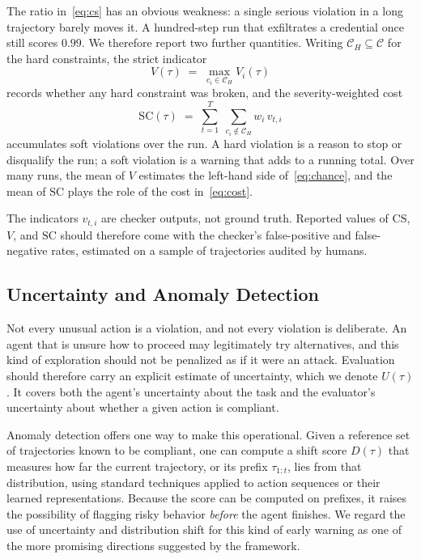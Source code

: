 \documentclass{article}
\begin{document}
The ratio in~\eqref{eq:cs} has an obvious weakness: a single serious violation in a long trajectory barely moves it. A hundred-step run that exfiltrates a credential once still scores $0.99$. We therefore report two further quantities. Writing $\mathcal{C}_H\subseteq\mathcal{C}$ for the hard constraints, the strict indicator
\begin{equation}
    V(\tau) \;=\; \max_{c_i\in\mathcal{C}_H} V_i(\tau)
    \label{eq:strict}
\end{equation}
records whether any hard constraint was broken, and the severity-weighted cost
\begin{equation}
    \mathrm{SC}(\tau) \;=\; \sum_{t=1}^{T}\;\sum_{c_i\notin\mathcal{C}_H} w_i\, v_{t,i}
    \label{eq:sc}
\end{equation}
accumulates soft violations over the run. A hard violation is a reason to stop or disqualify the run; a soft violation is a warning that adds to a running total. Over many runs, the mean of $V$ estimates the left-hand side of~\eqref{eq:chance}, and the mean of $\mathrm{SC}$ plays the role of the cost in~\eqref{eq:cost}.

The indicators $v_{t,i}$ are checker outputs, not ground truth. Reported values of $\mathrm{CS}$, $V$, and $\mathrm{SC}$ should therefore come with the checker's false-positive and false-negative rates, estimated on a sample of trajectories audited by humans.

\subsection{Uncertainty and Anomaly Detection}

Not every unusual action is a violation, and not every violation is deliberate. An agent that is unsure how to proceed may legitimately try alternatives, and this kind of exploration should not be penalized as if it were an attack. Evaluation should therefore carry an explicit estimate of uncertainty, which we denote $U(\tau)$. It covers both the agent's uncertainty about the task and the evaluator's uncertainty about whether a given action is compliant.

Anomaly detection offers one way to make this operational. Given a reference set of trajectories known to be compliant, one can compute a shift score $D(\tau)$ that measures how far the current trajectory, or its prefix $\tau_{1:t}$, lies from that distribution, using standard techniques \citep{chandola2009anomaly,hendrycks2017baseline} applied to action sequences or their learned representations. Because the score can be computed on prefixes, it raises the possibility of flagging risky behavior \emph{before} the agent finishes. We regard the use of uncertainty and distribution shift for this kind of early warning as one of the more promising directions suggested by the framework.
\end{document}
